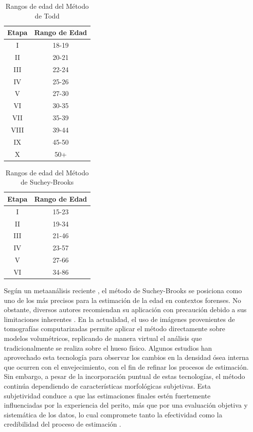 \begin{table}[h]
\centering
\begin{tabular}{|c|c|}
\hline
\rowcolor[HTML]{FFCB2F} 
{Etapa} & {Rango de Edad} \\ \hline
I & 18-19 \\ \hline
II & 20-21 \\ \hline
III & 22-24 \\ \hline
IV & 25-26 \\ \hline
V & 27-30 \\ \hline
VI & 30-35 \\ \hline
VII & 35-39 \\ \hline
VIII & 39-44 \\ \hline
IX & 45-50 \\ \hline
X & 50+ \\ \hline
\end{tabular}
\caption{Rangos de edad del Método de Todd}
\label{table:age_todd_}
\end{table}

\begin{table}[h]
\centering
\begin{tabular}{|c|c|}
\hline
\rowcolor[HTML]{FFCB2F} 
{Etapa} & {Rango de Edad} \\ \hline
I & 15-23 \\ \hline
II & 19-34 \\ \hline
III & 21-46 \\ \hline
IV & 23-57 \\ \hline
V & 27-66 \\ \hline
VI & 34-86 \\ \hline
\end{tabular}
\caption{Rangos de edad del Método de Suchey-Brooks}
\label{table:age_suchey_brooks}
\end{table}

Según un metaanálisis reciente \cite{schanandore2022accuracy}, el método de Suchey-Brooks se posiciona como uno de los más precisos para la estimación de la edad en contextos forenses. No obstante, diversos autores recomiendan su aplicación con precaución debido a sus limitaciones inherentes \cite{priya2017methods}. En la actualidad, el uso de imágenes provenientes de tomografías computarizadas permite aplicar el método directamente sobre modelos volumétricos, replicando de manera virtual el análisis que tradicionalmente se realiza sobre el hueso físico. Algunos estudios \cite{wade2011preliminary,villa2013forensic,lottering2014morphometric,lopez2015image} han aprovechado esta tecnología para observar los cambios en la densidad ósea interna que ocurren con el envejecimiento, con el fin de refinar los procesos de estimación. Sin embargo, a pesar de la incorporación puntual de estas tecnologías, el método continúa dependiendo de características morfológicas subjetivas. Esta subjetividad conduce a que las estimaciones finales estén fuertemente influenciadas por la experiencia del perito, más que por una evaluación objetiva y sistemática de los datos, lo cual compromete tanto la efectividad como la credibilidad del proceso de estimación \cite{garvin_current_2012}.

